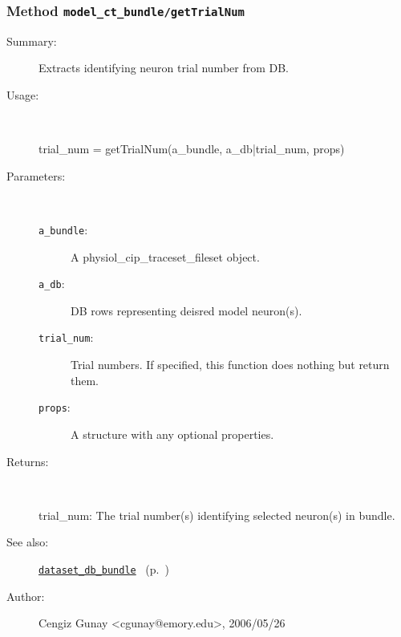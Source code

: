 \subsubsection[Method \texttt{getTrialNum}]{Method \texttt{model\_ct\_bundle/getTrialNum}}%
%
\label{ref_model_ct_bundle__getTrialNum}%
\hypertarget{ref_model_ct_bundle__getTrialNum}{}%
\begin{description}
\item[Summary:]Extracts identifying neuron trial number from DB.
%
\item[Usage:]~%
\begin{lyxcode}%
trial\_num = getTrialNum(a\_bundle, a\_db|trial\_num, props)
%
\end{lyxcode}%
%
%
\item[Parameters:]~
\begin{description}%
\item[\texttt{a\_bundle}:]
 A physiol\_cip\_traceset\_fileset object.
\item[\texttt{a\_db}:]
 DB rows representing deisred model neuron(s).
\item[\texttt{trial\_num}:]
 Trial numbers. If specified, this function does nothing but return them.
\item[\texttt{props}:]
 A structure with any optional properties.
\end{description}%
%
\item[Returns:
]~

	trial\_num: The trial number(s) identifying selected neuron(s) in bundle.
%
%
\item[See also:]%
\hyperlink{ref_dataset_db_bundle}{\texttt{dataset\_db\_bundle}}%
\ (p.~\pageref{ref_dataset_db_bundle})%
%
%
\item[Author:]%
Cengiz Gunay <cgunay@emory.edu>, 2006/05/26
%
\end{description}
\methodline%
